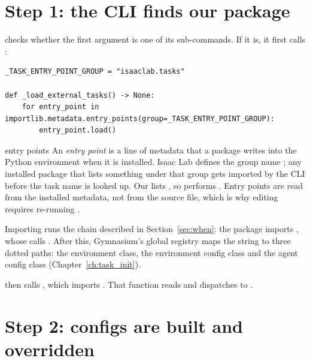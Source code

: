 \section{Step 1: the CLI finds our package}
\label{sec:step_cli}

 checks whether the first argument is one of its sub-commands. If
it is, it first calls :

\begin{lstlisting}[numbers=none]
_TASK_ENTRY_POINT_GROUP = "isaaclab.tasks"

def _load_external_tasks() -> None:
    for entry_point in importlib.metadata.entry_points(group=_TASK_ENTRY_POINT_GROUP):
        entry_point.load()
\end{lstlisting}

\begin{isaacbox}{entry points}
An \emph{entry point} is a line of metadata that a package writes into the
Python environment when it is installed. Isaac Lab defines the group name
; any installed package that lists something under that
group gets imported by the CLI before the task name is looked up. Our
 lists , so
 performs .
Entry points are read from the installed metadata, not from the source file,
which is why editing  requires re-running
.
\end{isaacbox}

Importing  runs the chain described in
Section~\ref{sec:when}: the package  imports ,
whose  calls . After this, Gymnasium's global
registry maps the string  to three dotted paths:
the environment class, the environment config class and the 
agent config class (Chapter~\ref{ch:task_init}).

 then calls , which imports
. That function reads
 and dispatches to
.

\section{Step 2: configs are built and overridden}
\label{sec:step_cfg}


